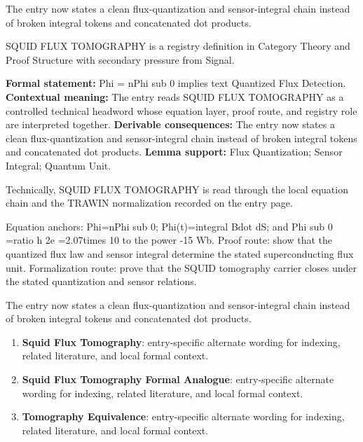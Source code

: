 The entry now states a clean flux-quantization and sensor-integral chain instead of broken integral tokens and concatenated dot products.
\clearpage


\begingroup\small
{}
SQUID FLUX TOMOGRAPHY is a registry definition in Category Theory and Proof Structure with secondary pressure from Signal.

\begingroup\footnotesize\setlength{\emergencystretch}{3em}\sloppy
\textbf{Formal statement:} Phi = nPhi sub 0 implies text Quantized Flux Detection. \textbf{Contextual meaning:} The entry reads SQUID FLUX TOMOGRAPHY as a controlled technical headword whose equation layer, proof route, and registry role are interpreted together. \textbf{Derivable consequences:} The entry now states a clean flux-quantization and sensor-integral chain instead of broken integral tokens and concatenated dot products. \textbf{Lemma support:} Flux Quantization; Sensor Integral; Quantum Unit.\par
\endgroup

Technically, SQUID FLUX TOMOGRAPHY is read through the local equation chain and the TRAWIN normalization recorded on the entry page.

Equation anchors: Phi=nPhi sub 0; Phi(t)=integral Bdot dS; and Phi sub 0 =ratio h 2e =2.07times 10 to the power -15 Wb. Proof route: show that the quantized flux law and sensor integral determine the stated superconducting flux unit. Formalization route: prove that the SQUID tomography carrier closes under the stated quantization and sensor relations.

The entry now states a clean flux-quantization and sensor-integral chain instead of broken integral tokens and concatenated dot products.
\endgroup

\begin{enumerate}[leftmargin=1.6em,itemsep=6pt,topsep=4pt]
\item \textbf{Squid Flux Tomography}: entry-specific alternate wording for indexing, related literature, and local formal context.
\item \textbf{Squid Flux Tomography Formal Analogue}: entry-specific alternate wording for indexing, related literature, and local formal context.
\item \textbf{Tomography Equivalence}: entry-specific alternate wording for indexing, related literature, and local formal context.
\end{enumerate}

